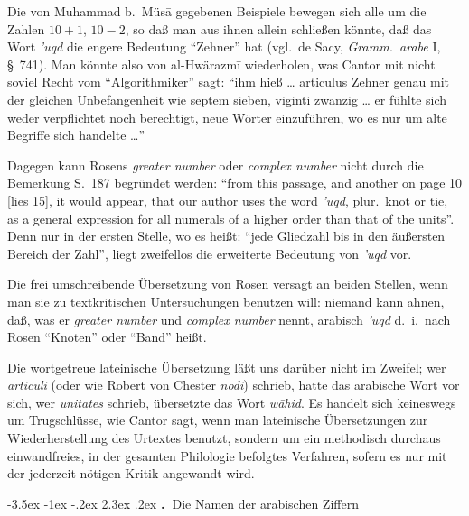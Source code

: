 \documentclass[11pt,a4paper]{article}
\makeatletter
\renewcommand{\section}{\@startsection{section}{1}{\z@}%
  {-3.5ex \@plus -1ex \@minus -.2ex}%
  {2.3ex \@plus .2ex}%
  {\normalfont\Large\bfseries\color{sectioncolor}\thesection.\ }}
\newcommand{\enquote}[1]{``#1''}
\makeatother
\begin{document}
Die von Muhammad b.\ M\"us\=a gegebenen Beispiele bewegen sich alle um die Zahlen $10 + 1$, $10 - 2$, so da\ss{} man aus ihnen allein schlie\ss{}en k\"onnte, da\ss{} das Wort \textit{'uqd} die engere Bedeutung \enquote{Zehner} hat (vgl.\ de Sacy, \textit{Gramm.\ arabe} I, \S\ 741). Man k\"onnte also von al-Hw\"arazm\={i} wiederholen, was Cantor mit nicht soviel Recht vom \enquote{Algorithmiker} sagt: \enquote{ihm hie\ss{} \ldots{} articulus Zehner genau mit der gleichen Unbefangenheit wie septem sieben, viginti zwanzig \ldots{} er f\"uhlte sich weder verpflichtet noch berechtigt, neue W\"orter einzuf\"uhren, wo es nur um alte Begriffe sich handelte \ldots{}}

Dagegen kann Rosens \textit{greater number} oder \textit{complex number} nicht durch die Bemerkung S.\ 187 begr\"undet werden: \enquote{from this passage, and another on page 10 [lies 15], it would appear, that our author uses the word \textit{'uqd}, plur.\ knot or tie, as a general expression for all numerals of a higher order than that of the units}. Denn nur in der ersten Stelle, wo es hei\ss{}t: \enquote{jede Gliedzahl bis in den \"au\ss{}ersten Bereich der Zahl}, liegt zweifellos die erweiterte Bedeutung von \textit{'uqd} vor.

Die frei umschreibende \"Ubersetzung von Rosen versagt an beiden Stellen, wenn man sie zu textkritischen Untersuchungen benutzen will: niemand kann ahnen, da\ss{}, was er \textit{greater number} und \textit{complex number} nennt, arabisch \textit{'uqd} d.\ i.\ nach Rosen \enquote{Knoten} oder \enquote{Band} hei\ss{}t.

Die wortgetreue lateinische \"Ubersetzung l\"a\ss{}t uns dar\"uber nicht im Zweifel; wer \textit{articuli} (oder wie Robert von Chester \textit{nodi}) schrieb, hatte das arabische Wort vor sich, wer \textit{unitates} schrieb, \"ubersetzte das Wort \textit{w\=ahid}. Es handelt sich keineswegs um Trugschl\"usse, wie Cantor sagt, wenn man lateinische \"Ubersetzungen zur Wiederherstellung des Urtextes benutzt, sondern um ein methodisch durchaus einwandfreies, in der gesamten Philologie befolgtes Verfahren, sofern es nur mit der jederzeit n\"otigen Kritik angewandt wird.

\clearpage

\section{Die Namen der arabischen Ziffern}
\end{document}
